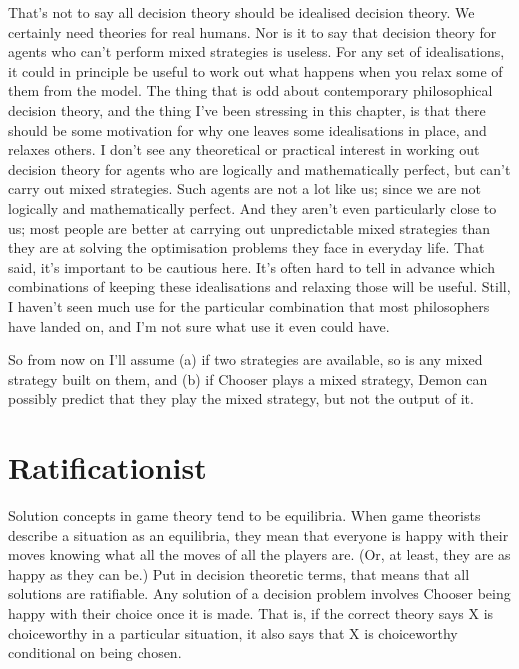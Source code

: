 \documentclass[
  12pt,
  letterpaper,
  DIV=11,
  numbers=noendperiod]{scrreprt}
\begin{document}
That's not to say all decision theory should be idealised decision
theory. We certainly need theories for real humans. Nor is it to say
that decision theory for agents who can't perform mixed strategies is
useless. For any set of idealisations, it could in principle be useful
to work out what happens when you relax some of them from the model. The
thing that is odd about contemporary philosophical decision theory, and
the thing I've been stressing in this chapter, is that there should be
some motivation for why one leaves some idealisations in place, and
relaxes others. I don't see any theoretical or practical interest in
working out decision theory for agents who are logically and
mathematically perfect, but can't carry out mixed strategies. Such
agents are not a lot like us; since we are not logically and
mathematically perfect. And they aren't even particularly close to us;
most people are better at carrying out unpredictable mixed strategies
than they are at solving the optimisation problems they face in everyday
life. That said, it's important to be cautious here. It's often hard to
tell in advance which combinations of keeping these idealisations and
relaxing those will be useful. Still, I haven't seen much use for the
particular combination that most philosophers have landed on, and I'm
not sure what use it even could have.

So from now on I'll assume (a) if two strategies are available, so is
any mixed strategy built on them, and (b) if Chooser plays a mixed
strategy, Demon can possibly predict that they play the mixed strategy,
but not the output of it.


\hypertarget{sec-ratify}{%
\chapter{Ratificationist}\label{sec-ratify}}

Solution concepts in game theory tend to be equilibria. When game
theorists describe a situation as an equilibria, they mean that everyone
is happy with their moves knowing what all the moves of all the players
are. (Or, at least, they are as happy as they can be.) Put in decision
theoretic terms, that means that all solutions are ratifiable. Any
solution of a decision problem involves Chooser being happy with their
choice once it is made. That is, if the correct theory says X is
choiceworthy in a particular situation, it also says that X is
choiceworthy conditional on being chosen.
\end{document}
